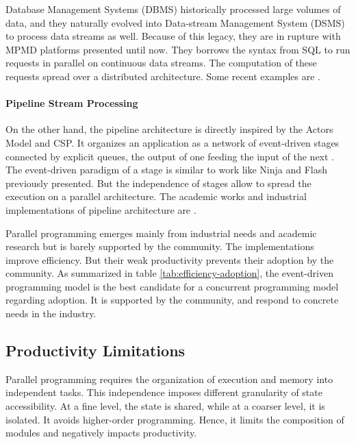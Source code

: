 Database Management Systems (DBMS) historically processed large volumes of data, and they naturally evolved into Data-stream Management System (DSMS) to process data streams as well.
Because of this legacy, they are in rupture with MPMD platforms presented until now.
They borrows the syntax from SQL to run requests in parallel on continuous data streams.
The computation of these requests spread over a distributed architecture.
Some recent examples are .

\paragraph{Pipeline Stream Processing}


On the other hand, the pipeline architecture is directly inspired by the Actors Model and CSP.
It organizes an application as a network of event-driven stages connected by explicit queues, the output of one feeding the input of the next \cite{Welsh2001}.
The event-driven paradigm of a stage is similar to work like Ninja \cite{Gribble2001} and Flash \cite{Pai1999} previously presented.
But the independence of stages allow to spread the execution on a parallel architecture.
The academic works and industrial implementations of pipeline architecture are .

\separator

Parallel programming emerges mainly from industrial needs and academic research but is barely supported by the community.
The implementations improve efficiency.
But their weak productivity prevents their adoption by the community.
As summarized in table \ref{tab:efficiency-adoption}, the event-driven programming model is the best candidate for a concurrent programming model regarding adoption.
It is supported by the community, and respond to concrete needs in the industry.


\subsection{Productivity Limitations} \label{chapter3:software-efficiency:productivity-limitations}

Parallel programming requires the organization of execution and memory into independent tasks.
This independence imposes different granularity of state accessibility.
At a fine level, the state is shared, while at a coarser level, it is isolated.
It avoids higher-order programming.
Hence, it limits the composition of modules and negatively impacts productivity.

